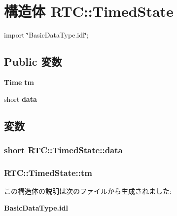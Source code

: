 \section{構造体 RTC::TimedState}
\label{structRTC_1_1TimedState}


{\ttfamily import \char`\"{}BasicDataType.idl\char`\"{};}

\subsection*{Public 変数}
\begin{DoxyCompactItemize}
\item 
{\bf Time} {\bf tm}
\item 
short {\bf data}
\end{DoxyCompactItemize}


\subsection{変数}
\subsubsection[{data}]{\setlength{\rightskip}{0pt plus 5cm}short {\bf RTC::TimedState::data}}\label{structRTC_1_1TimedState_ac5a52665ab3dc6b8d92a68486c93745e}
\subsubsection[{tm}]{ {\bf RTC::TimedState::tm}}\label{structRTC_1_1TimedState_a3d685c8b4f9db1ed6734b7358ab063c8}


この構造体の説明は次のファイルから生成されました:\begin{DoxyCompactItemize}
\item 
{\bf BasicDataType.idl}\end{DoxyCompactItemize}
